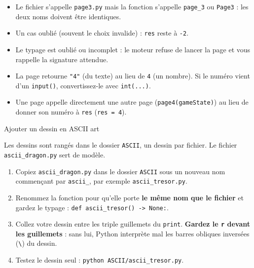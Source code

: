\documentclass[11pt,a4paper]{article}
\makeatletter
\renewcommand\section{\@startsection{section}{1}{0pt}{1.6em}{0.8em}%
  {\Large\bfseries\color{nuit}}}
\newcommand{\fichier}[1]{\texttt{\color{nuit}#1}}
\makeatother
\begin{document}
\begin{astuce}
\begin{itemize}[leftmargin=1.2em]
  \item Le fichier s'appelle \fichier{page3.py} mais la fonction s'appelle \texttt{page\_3}
        ou \texttt{Page3} : les deux noms doivent être identiques.
  \item Un cas oublié (souvent le choix invalide) : \texttt{res} reste à \texttt{-2}.
  \item Le typage est oublié ou incomplet : le moteur refuse de lancer la page et vous
        rappelle la signature attendue.
  \item La page retourne \texttt{"4"} (du texte) au lieu de \texttt{4} (un nombre).
        Si le numéro vient d'un \texttt{input()}, convertissez-le avec \texttt{int(...)}.
  \item Une page appelle directement une autre page (\texttt{page4(gameState)}) au lieu
        de donner son numéro à \texttt{res} (\texttt{res = 4}).
\end{itemize}
\end{astuce}

\section{Ajouter un dessin en ASCII art}

Les dessins sont rangés dans le dossier \fichier{ASCII}, un dessin par fichier.
Le fichier \fichier{ascii\_dragon.py} sert de modèle.

\begin{enumerate}
  \item Copiez \fichier{ascii\_dragon.py} dans le dossier \fichier{ASCII} sous un nouveau
        nom commençant par \fichier{ascii\_}, par exemple \fichier{ascii\_tresor.py}.
  \item Renommez la fonction pour qu'elle porte \textbf{le même nom que le fichier} et
        gardez le typage : \texttt{def ascii\_tresor() -> None:}.
  \item Collez votre dessin entre les triple guillemets du \texttt{print}.
        \textbf{Gardez le \texttt{r} devant les guillemets} : sans lui, Python interprète
        mal les barres obliques inversées (\texttt{\textbackslash}) du dessin.
  \item Testez le dessin seul : \texttt{python ASCII/ascii\_tresor.py}.
\end{enumerate}
\end{document}
